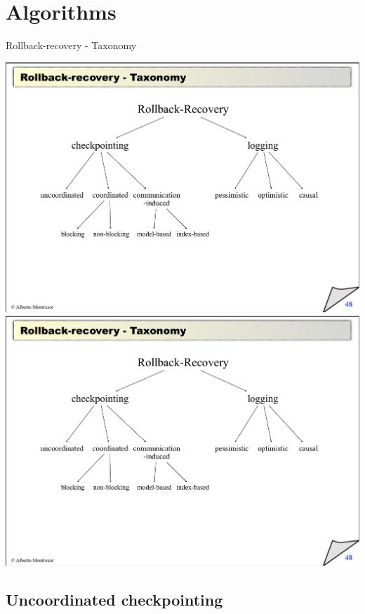 \section{Algorithms}

\begin{frame}{Rollback-recovery - Taxonomy}
\begin{overprint}
\includegraphics[width=\textwidth,page=1]{taxonomy.pdf}
\includegraphics[width=\textwidth,page=2]{taxonomy.pdf}
\end{overprint}
\end{frame}

\subsection{Uncoordinated checkpointing}

